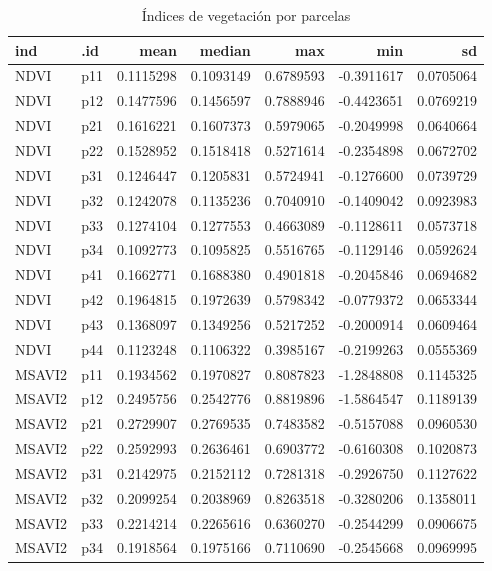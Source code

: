 \documentclass[spanish,openany]{article}
\begin{document}
\begin{table}[!h]

\caption{\label{tab:unnamed-chunk-4}Índices de vegetación por parcelas}
\centering
\begin{tabular}[t]{llrrrrr}
\toprule
ind & .id & mean & median & max & min & sd\\
\midrule
NDVI & p11 & 0.1115298 & 0.1093149 & 0.6789593 & -0.3911617 & 0.0705064\\
NDVI & p12 & 0.1477596 & 0.1456597 & 0.7888946 & -0.4423651 & 0.0769219\\
NDVI & p21 & 0.1616221 & 0.1607373 & 0.5979065 & -0.2049998 & 0.0640664\\
NDVI & p22 & 0.1528952 & 0.1518418 & 0.5271614 & -0.2354898 & 0.0672702\\
NDVI & p31 & 0.1246447 & 0.1205831 & 0.5724941 & -0.1276600 & 0.0739729\\
\addlinespace
NDVI & p32 & 0.1242078 & 0.1135236 & 0.7040910 & -0.1409042 & 0.0923983\\
NDVI & p33 & 0.1274104 & 0.1277553 & 0.4663089 & -0.1128611 & 0.0573718\\
NDVI & p34 & 0.1092773 & 0.1095825 & 0.5516765 & -0.1129146 & 0.0592624\\
NDVI & p41 & 0.1662771 & 0.1688380 & 0.4901818 & -0.2045846 & 0.0694682\\
NDVI & p42 & 0.1964815 & 0.1972639 & 0.5798342 & -0.0779372 & 0.0653344\\
\addlinespace
NDVI & p43 & 0.1368097 & 0.1349256 & 0.5217252 & -0.2000914 & 0.0609464\\
NDVI & p44 & 0.1123248 & 0.1106322 & 0.3985167 & -0.2199263 & 0.0555369\\
MSAVI2 & p11 & 0.1934562 & 0.1970827 & 0.8087823 & -1.2848808 & 0.1145325\\
MSAVI2 & p12 & 0.2495756 & 0.2542776 & 0.8819896 & -1.5864547 & 0.1189139\\
MSAVI2 & p21 & 0.2729907 & 0.2769535 & 0.7483582 & -0.5157088 & 0.0960530\\
\addlinespace
MSAVI2 & p22 & 0.2592993 & 0.2636461 & 0.6903772 & -0.6160308 & 0.1020873\\
MSAVI2 & p31 & 0.2142975 & 0.2152112 & 0.7281318 & -0.2926750 & 0.1127622\\
MSAVI2 & p32 & 0.2099254 & 0.2038969 & 0.8263518 & -0.3280206 & 0.1358011\\
MSAVI2 & p33 & 0.2214214 & 0.2265616 & 0.6360270 & -0.2544299 & 0.0906675\\
MSAVI2 & p34 & 0.1918564 & 0.1975166 & 0.7110690 & -0.2545668 & 0.0969995\\

\end{tabular}
\end{table}
\end{document}
